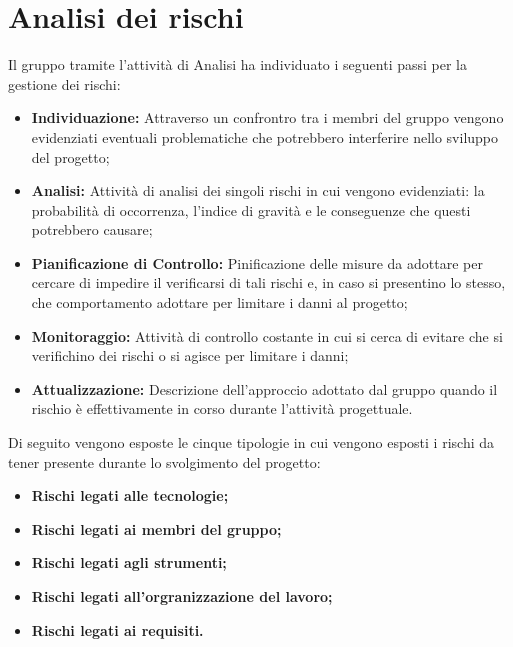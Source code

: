 \section{Analisi dei rischi}

Il gruppo \Gruppo tramite l'attività di Analisi ha individuato i seguenti passi per la gestione dei rischi:

\begin{itemize}

    \item{\textbf{Individuazione:}} Attraverso un confrontro tra i membri del gruppo vengono evidenziati eventuali problematiche che potrebbero interferire nello sviluppo del progetto;

    \item{\textbf{Analisi:}} Attività di analisi dei singoli rischi in cui vengono evidenziati: la probabilità di occorrenza, l'indice di gravità e le conseguenze che  questi potrebbero causare;

    \item{\textbf{Pianificazione di Controllo:}} Pinificazione delle misure da adottare per cercare di impedire il verificarsi di tali rischi e, in caso si presentino lo stesso, che comportamento adottare per limitare i danni al progetto;

    \item{\textbf{Monitoraggio:}} Attività di controllo costante in cui si cerca di evitare che si verifichino dei rischi o si agisce per limitare i danni;

    \item{\textbf{Attualizzazione:}} Descrizione dell'approccio adottato dal gruppo quando il rischio è effettivamente in corso durante l'attività progettuale.
\end{itemize}

Di seguito vengono esposte le cinque tipologie in cui vengono esposti i rischi da tener presente durante lo svolgimento del progetto:

\begin{itemize}
    \item{\textbf{Rischi legati alle tecnologie;}}
    \item {\textbf{Rischi legati ai membri del gruppo;}}
    \item {\textbf{Rischi legati agli strumenti;}}
    \item {\textbf{Rischi legati all'orgranizzazione del lavoro;}}
    \item {\textbf{Rischi legati ai requisiti.}}
\end{itemize}

\newpage


\newpage


\newpage


\newpage


\newpage
